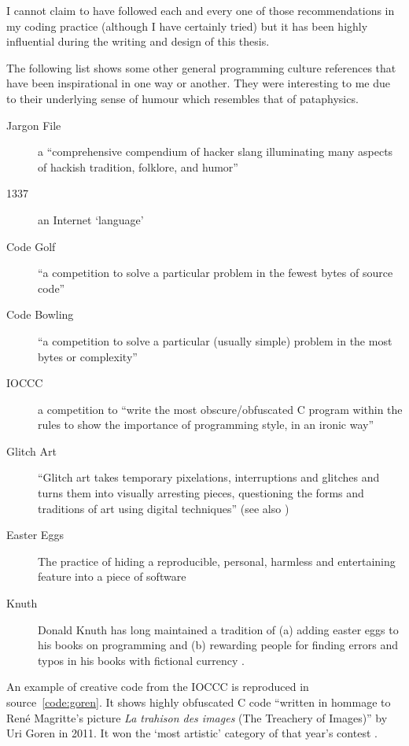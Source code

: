 I cannot claim to have followed each and every one of those recommendations in my coding practice (although I have certainly tried) but it has been highly influential during the writing and design of this thesis.

\spirals

The following list shows some other general programming culture references that have been inspirational in one way or another. They were interesting to me due to their underlying sense of humour which resembles that of pataphysics.

\begin{description}
  \item [Jargon File] a ``comprehensive compendium of hacker slang illuminating many aspects of hackish tradition, folklore, and humor'' \autocite{Raymond2004}
  \item [1337] an Internet `language' \autocite{Thrid2002}
  \item [Code Golf] ``a competition to solve a particular problem in the fewest bytes of source code'' \autocite{StackExchangend}
  \item [Code Bowling] ``a competition to solve a particular (usually simple) problem in the most bytes or complexity'' \autocite{StackBowlnd}
  \item [IOCCC] a competition to ``write the most obscure/obfuscated C program within the rules to show the importance of programming style, in an ironic way'' \autocite{Broukhis}
  \item [Glitch Art] ``Glitch art takes temporary pixelations, interruptions and glitches and turns them into visually arresting pieces, questioning the forms and traditions of art using digital techniques'' \autocite{Wong2013} (see also \autocite{GoogleGlitch,RedditGlitch})
  \item [Easter Eggs] The practice of hiding a reproducible, personal, harmless and entertaining feature into a piece of software \autocite{Wolfnd}
  \item [Knuth] Donald Knuth has long maintained a tradition of (a) adding easter eggs to his books on programming and (b) rewarding people for finding errors and typos in his books with fictional currency \autocite{KnuthHelp}.
\end{description}

An example of creative code from the \ac{IOCCC} is reproduced in source~\ref{code:goren}. It shows highly obfuscated C code ``written in hommage to Ren{\'e} Magritte's picture \textit{La trahison des images} (The Treachery of Images)'' by Uri Goren in 2011. It won the `most artistic' category of that year's contest \autocite{Goren2011}.

